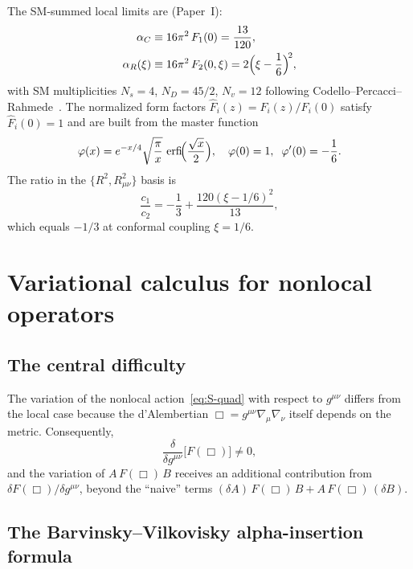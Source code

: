 \documentclass[12pt,a4paper]{article}
\newcommand{\erfi}{\operatorname{erfi}}
\theoremstyle{plain}
\theoremstyle{definition}
\begin{document}
The SM-summed local limits are (Paper~I):
\begin{align}
  \alpha_C &\equiv 16\pi^2\,F_1(0) = \frac{13}{120},
  \label{eq:alpha_C}\\
  \alpha_R(\xi) &\equiv 16\pi^2\,F_2(0,\xi)
  = 2\Bigl(\xi - \frac{1}{6}\Bigr)^{\!2},
  \label{eq:alpha_R}
\end{align}
with SM multiplicities $N_s = 4$, $N_D = 45/2$, $N_v = 12$ following
Codello--Percacci--Rahmede~\cite{Codello:2008vh}.  The normalized form
factors $\hat{F}_i(z) = F_i(z)/F_i(0)$ satisfy $\hat{F}_i(0) = 1$ and are
built from the master function
\begin{equation}\label{eq:master-phi}
  \varphi(x) = e^{-x/4}\sqrt{\frac{\pi}{x}}\,\erfi\!\Bigl(
  \frac{\sqrt{x}}{2}\Bigr),
  \quad \varphi(0) = 1,\;\; \varphi'(0) = -\frac{1}{6}.
\end{equation}
The ratio in the $\{R^2, R_{\mu\nu}^2\}$ basis is
\begin{equation}\label{eq:c1c2-ratio}
  \frac{c_1}{c_2}
  = -\frac{1}{3} + \frac{120(\xi-1/6)^2}{13},
\end{equation}
which equals $-1/3$ at conformal coupling $\xi = 1/6$.

\section{Variational calculus for nonlocal operators}
\label{sec:variation}

\subsection{The central difficulty}

The variation of the nonlocal action~\eqref{eq:S-quad} with respect to
$g^{\mu\nu}$ differs from the local case because the d'Alembertian
$\Box = g^{\mu\nu}\nabla_\mu\nabla_\nu$ itself depends on the metric.
Consequently,
\begin{equation}\label{eq:delta-noncommute}
  \frac{\delta}{\delta g^{\mu\nu}}\bigl[F(\Box)\bigr] \neq 0,
\end{equation}
and the variation of $A\,F(\Box)\,B$ receives an additional contribution
from $\delta F(\Box)/\delta g^{\mu\nu}$, beyond the ``naive'' terms
$(\delta A)\,F(\Box)\,B + A\,F(\Box)\,(\delta B)$.

\subsection{The Barvinsky--Vilkovisky alpha-insertion formula}
\end{document}
